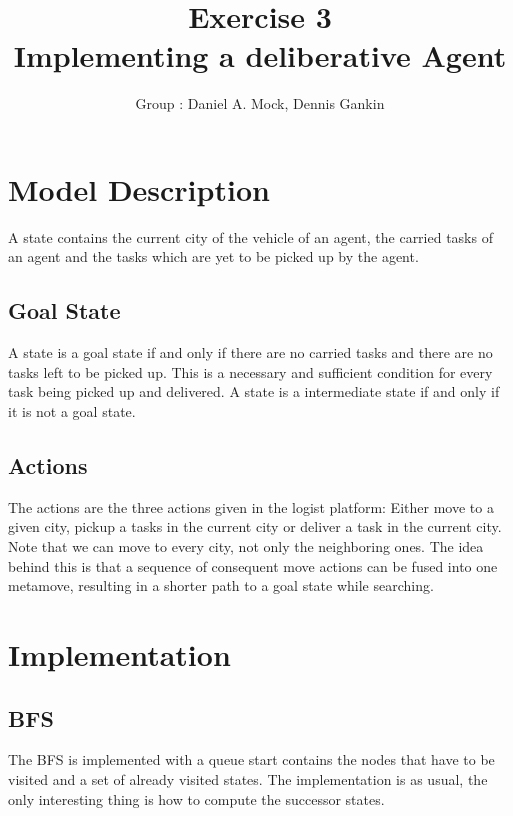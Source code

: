 \documentclass[11pt]{article}
\title{\bf Exercise 3\\ Implementing a deliberative Agent}
\author{Group \textnumero 29: Daniel A. Mock, Dennis Gankin}
\begin{document}
\maketitle

\section{Model Description}
A state contains the current city of the vehicle of an agent, the carried tasks of an agent and the tasks which are yet to be picked up by the agent.

%

\subsection{Goal State}
A state is a goal state if and only if there are no carried tasks and there are no tasks left to be picked up.
This is a necessary and sufficient condition for every task being picked up and delivered.
A state is a intermediate state if and only if it is not a goal state.

\subsection{Actions}
The actions are the three actions given in the logist platform: Either move to a given city, pickup a tasks in the current city or deliver a task in the current city.
Note that we can move to every city, not only the neighboring ones.
The idea behind this is that a sequence of consequent move actions can be fused into one metamove, resulting in a shorter path to a goal state while searching.

\section{Implementation}

\subsection{BFS}
The BFS is implemented with a queue start contains the nodes that have to be visited and a set of already visited states.
The implementation is as usual, the only interesting thing is how to compute the successor states.
\end{document}
